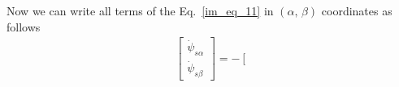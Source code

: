 \documentclass[12pt,a4paper,oneside]{book}
\begin{document}
\begin{onehalfspace}
Now we can write all terms of the Eq.~\eqref{im_eq_11} in $(\alpha,\,\beta)$ 
coordinates as follows
\begin{equation} \label{im_eq_20}
	\begin{aligned}
		&\left[
		\begin{matrix}
			\dot{\psi}_{s\alpha} \\[6pt]
			\dot{\psi}_{s\beta}
		\end{matrix} \right] = -
		\left[
		\begin{matrix}

\end{matrix}
\end{aligned}
\end{equation}
\end{onehalfspace}
\end{document}

